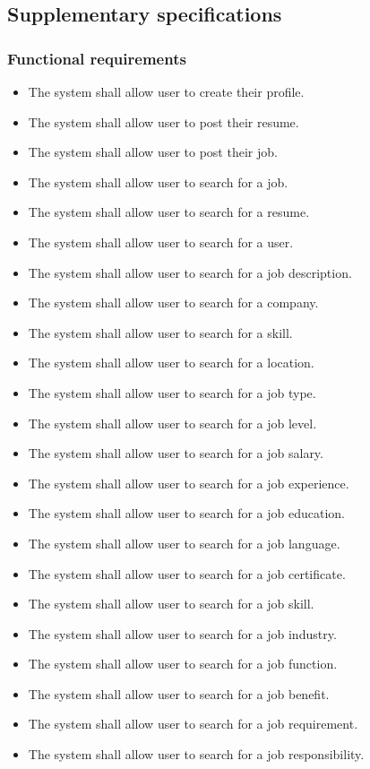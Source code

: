 \documentclass[a4paper]{article}
\begin{document}
\subsection{Supplementary specifications}
\subsubsection{Functional requirements}
\begin{itemize}
  \item The system shall allow user to create their profile.
  \item The system shall allow user to post their resume.
  \item The system shall allow user to post their job.
  \item The system shall allow user to search for a job.
  \item The system shall allow user to search for a resume.
  \item The system shall allow user to search for a user.
  \item The system shall allow user to search for a job description.
  \item The system shall allow user to search for a company.
  \item The system shall allow user to search for a skill.
  \item The system shall allow user to search for a location.
  \item The system shall allow user to search for a job type.
  \item The system shall allow user to search for a job level.
  \item The system shall allow user to search for a job salary.
  \item The system shall allow user to search for a job experience.
  \item The system shall allow user to search for a job education.
  \item The system shall allow user to search for a job language.
  \item The system shall allow user to search for a job certificate.
  \item The system shall allow user to search for a job skill.
  \item The system shall allow user to search for a job industry.
  \item The system shall allow user to search for a job function.
  \item The system shall allow user to search for a job benefit.
  \item The system shall allow user to search for a job requirement.
  \item The system shall allow user to search for a job responsibility.
\end{itemize}
\end{document}
